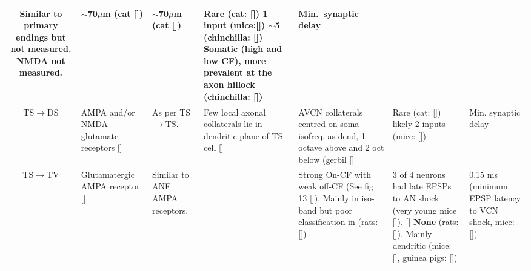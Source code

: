 \begin{longtable}{cYYYYYY}
Similar to primary endings but not measured.  
NMDA not measured.           
                                & 
$\sim$70$\mu$m (cat []) 
                                & %
$\sim$70$\mu$m (cat []) 
                                & %
Rare (cat: []) 
1 input (mice:[])                     
$\sim$5 (chinchilla: [])
Somatic (high and low CF), more prevalent at the axon hillock   
(chinchilla: [])
                                & %
Min.\ synaptic delay \\ \midrule
TS\ensuremath{\rightarrow}DS                        
                                & %
AMPA and/or NMDA glutamate receptors []  
                                & 
As per TS\ensuremath{\rightarrow}TS.
                                & %
Few local axonal collaterals lie in dendritic plane of TS cell []
                                & %
AVCN collaterals centred on soma isofreq. as dend, 1 octave above and 2 oct below (gerbil []
                                & 
Rare  (cat: [])
likely 2 inputs (mice: []) 
                                & 
Min. synaptic delay \\ \midrule
TS\ensuremath{\rightarrow}TV                        
                                & %
Glutamatergic AMPA receptor  [].
                                & 
Similar to ANF AMPA receptors.        
                                & %

                                & %
Strong On-CF with weak off-CF  (See fig 13 []). 
Mainly in iso-band but poor classification in (rats: [])         
                                & %
3 of 4 neurons had late EPSPs to AN shock (very young mice []).
[] 
\textbf{None} (rats: []).
Mainly dendritic (mice: [],
guinea pigs: [])   
                                & %
0.15 ms (minimum EPSP latency to VCN shock, mice: [])
\\ \midrule



\end{longtable}
